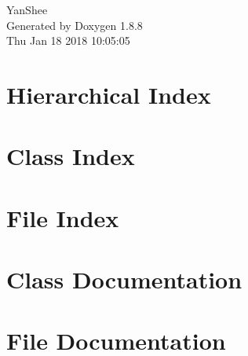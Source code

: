 \documentclass[twoside]{book}
\newcommand{\+}{\discretionary{\mbox{\scriptsize$\hookleftarrow$}}{}{}}
\newcommand{\clearemptydoublepage}{%
  \newpage{\pagestyle{empty}\cleardoublepage}%
}
\begin{document}
\hypersetup{pageanchor=false,
             bookmarks=true,
             bookmarksnumbered=true,
             pdfencoding=unicode
            }
\begin{titlepage}
\vspace*{7cm}
\begin{center}%
{\Large Yan\+Shee }\\
\vspace*{1cm}
{\large Generated by Doxygen 1.8.8}\\
\vspace*{0.5cm}
{\small Thu Jan 18 2018 10:05:05}\\
\end{center}
\end{titlepage}
\clearemptydoublepage
\tableofcontents
\clearemptydoublepage
{}
\hypersetup{pageanchor=true}

\chapter{Hierarchical Index}

\chapter{Class Index}

\chapter{File Index}

\chapter{Class Documentation}
























\chapter{File Documentation}


\newpage
{}
{}
\printindex
\end{document}
